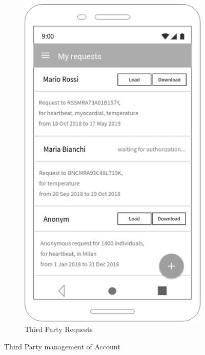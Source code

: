 \begin{figure}[h!]
\begin{subfigure}[b]{0.4\linewidth}
    \includegraphics[width=\linewidth]{img/mockup/tp_requests.jpg}
    \caption{Third Party Requests}
  \end{subfigure}
\caption{Third Party management of Account }
 \end{figure}

